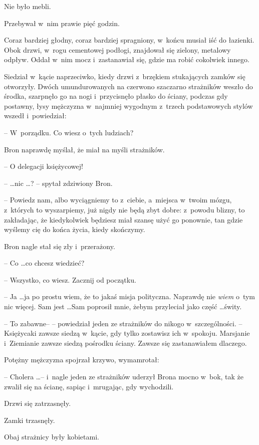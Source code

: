\documentclass[oneside,polish,11pt,rmheadings]{mwbk}
\begin{document}
Nie było mebli. 

Przebywał w~nim prawie pięć godzin. 

Coraz bardziej głodny, coraz bardziej spragniony, w~końcu musiał iść do łazienki. Obok drzwi, w~rogu cementowej podłogi, znajdował się zielony, metalowy odpływ. Oddał w~nim mocz i~zastanawiał się, gdzie ma robić cokolwiek innego. 

Siedział w~kącie naprzeciwko, kiedy drzwi z~brzękiem stukających zamków się otworzyły. Dwóch umundurowanych na czerwono \dywiz szaczarno strażników weszło do środka, szarpnęło go na nogi i~przycisnęło płasko do ściany, podczas gdy postawny, łysy mężczyzna w~najmniej wygodnym z~trzech podstawowych stylów wszedł i~powiedział: 

-- W~porządku. Co wiesz o~tych ludziach? 

Bron naprawdę myślał, że miał na myśli strażników. 

-- O delegacji księżycowej! 

--  \ldots  nic \ldots  ?  -- spytał zdziwiony Bron. 

-- Powiedz nam, albo wyciągniemy to z~ciebie, a~miejsca w~twoim mózgu, z~których to wyszarpiemy, już nigdy nie będą zbyt dobre: z~powodu blizny, to zakładając, że kiedykolwiek będziesz miał szansę użyć go ponownie, tan gdzie wyślemy cię do końca życia, kiedy skończymy. 

Bron nagle stał się zły i~przerażony. 

-- Co \ldots  co chcesz wiedzieć? 

-- Wszystko, co wiesz. Zacznij od początku. 

-- Ja \ldots   ja po prostu wiem, że to jakaś misja polityczna. Naprawdę nie \textit{wiem } o~tym nic więcej. Sam jest \ldots  Sam poprosił mnie, żebym przyleciał jako część \ldots  świty. 

-- To zabawne-- -- powiedział jeden ze strażników do nikogo w~szczególności. -- Księżycaki zawsze siedzą w~kącie, gdy tylko zostawisz ich w~spokoju. Marsjanie i~Ziemianie zawsze siedzą pośrodku ściany. Zawsze się zastanawiałem dlaczego. 

Potężny mężczyzna spojrzał krzywo, wymamrotał: 

-- Cholera \ldots  -- i~nagle jeden ze strażników uderzył Brona mocno w~bok, tak że zwalił się na ścianę, sapiąc i~mrugając, gdy wychodzili. 

Drzwi się zatrzasnęły. 

Zamki trzasnęły. 

Obaj strażnicy były kobietami. 
\end{document}
